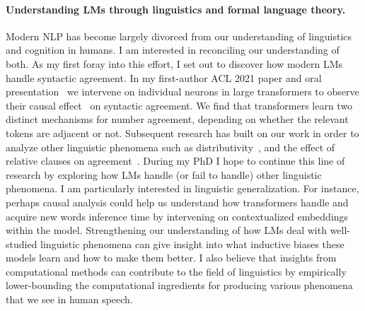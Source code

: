 \documentclass[11pt]{article}
\begin{document}
\paragraph{Understanding LMs through linguistics and formal language theory.}
Modern NLP has become largely divorced 
from our understanding of linguistics and cognition in humans.
I am interested in reconciling our understanding of both.
As my first foray into this effort, I set out to 
discover how modern LMs handle syntactic agreement.
In my first-author ACL 2021 paper and oral presentation~\cite{Finlayson2021CausalAO}
we intervene on individual neurons in large transformers 
to observe their causal effect~\cite{Pearl2001DirectAI} on syntactic agreement.
We find that transformers learn 
two distinct mechanisms for number agreement,
depending on whether the relevant tokens are adjacent or not.
Subsequent research has built on our work 
in order to analyze other linguistic phenomena 
such as distributivity~\cite{Ban2022TestingPL},
and the effect of relative clauses on agreement~\cite{Ravfogel2021CounterfactualIR}.
During my PhD I hope to continue this line of research 
by exploring how LMs handle (or fail to handle) 
other linguistic phenomena. 
I am particularly interested in linguistic generalization.
For instance, perhaps causal analysis could help us understand
how transformers handle and acquire new words inference time
by intervening on contextualized embeddings within the model.
Strengthening our understanding of how 
LMs deal with well-studied linguistic phenomena
can give insight into what inductive biases these models learn 
and how to make them better. 
I also believe that insights from computational methods 
can contribute to the field of linguistics
by empirically lower-bounding the computational ingredients 
for producing various phenomena that we see in human speech.
\end{document}
